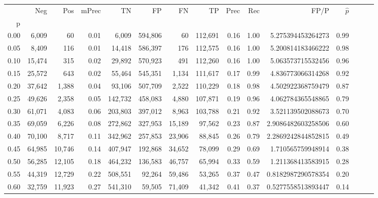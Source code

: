 \begin{tabular}{rrrrrrrrrrrrrrr}
\toprule
{} &     Neg &     Pos & mPrec &       TN &       FP &       FN &       TP &  Prec &   Rec &                  FP/P & $\hat{p}$ \\
p    &         &         &       &          &          &          &          &       &       &                       &           \\
\midrule
0.00 &   6,009 &      60 &  0.01 &    6,009 &  594,806 &       60 &  112,691 &  0.16 &  1.00 &     5.275394453264273 &      0.99 \\
0.05 &   8,409 &     116 &  0.01 &   14,418 &  586,397 &      176 &  112,575 &  0.16 &  1.00 &     5.200814183466222 &      0.98 \\
0.10 &  15,474 &     315 &  0.02 &   29,892 &  570,923 &      491 &  112,260 &  0.16 &  1.00 &     5.063573715532456 &      0.96 \\
0.15 &  25,572 &     643 &  0.02 &   55,464 &  545,351 &    1,134 &  111,617 &  0.17 &  0.99 &     4.836773066314268 &      0.92 \\
0.20 &  37,642 &   1,388 &  0.04 &   93,106 &  507,709 &    2,522 &  110,229 &  0.18 &  0.98 &     4.502922368759479 &      0.87 \\
0.25 &  49,626 &   2,358 &  0.05 &  142,732 &  458,083 &    4,880 &  107,871 &  0.19 &  0.96 &     4.062784365548865 &      0.79 \\
0.30 &  61,071 &   4,083 &  0.06 &  203,803 &  397,012 &    8,963 &  103,788 &  0.21 &  0.92 &     3.521139502088673 &      0.70 \\
0.35 &  69,059 &   6,226 &  0.08 &  272,862 &  327,953 &   15,189 &   97,562 &  0.23 &  0.87 &    2.9086482603258506 &      0.60 \\
0.40 &  70,100 &   8,717 &  0.11 &  342,962 &  257,853 &   23,906 &   88,845 &  0.26 &  0.79 &    2.2869242844852815 &      0.49 \\
0.45 &  64,985 &  10,746 &  0.14 &  407,947 &  192,868 &   34,652 &   78,099 &  0.29 &  0.69 &     1.710565759948914 &      0.38 \\
0.50 &  56,285 &  12,105 &  0.18 &  464,232 &  136,583 &   46,757 &   65,994 &  0.33 &  0.59 &     1.211368413583915 &      0.28 \\
0.55 &  44,319 &  12,729 &  0.22 &  508,551 &   92,264 &   59,486 &   53,265 &  0.37 &  0.47 &    0.8182987290578354 &      0.20 \\
0.60 &  32,759 &  11,923 &  0.27 &  541,310 &   59,505 &   71,409 &   41,342 &  0.41 &  0.37 &    0.5277558513893447 &      0.14 \\

\end{tabular}
